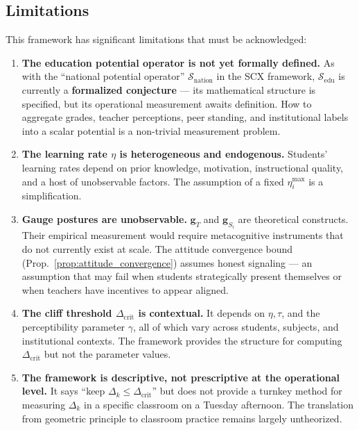 \documentclass[11pt,a4paper]{article}
\newcommand{\cS}{\mathcal{S}}
\begin{document}
\subsection{Limitations}
This framework has significant limitations that must be acknowledged:
\begin{enumerate}[label=(\arabic*)]
    \item \textbf{The education potential operator is not yet formally defined.} As with the ``national potential operator'' $\cS_{\text{nation}}$ in the SCX framework, $\cS_{\text{edu}}$ is currently a \textbf{formalized conjecture} — its mathematical structure is specified, but its operational measurement awaits definition. How to aggregate grades, teacher perceptions, peer standing, and institutional labels into a scalar potential is a non-trivial measurement problem.
    \item \textbf{The learning rate $\eta$ is heterogeneous and endogenous.} Students' learning rates depend on prior knowledge, motivation, instructional quality, and a host of unobservable factors. The assumption of a fixed $\eta_i^{\max}$ is a simplification.
    \item \textbf{Gauge postures are unobservable.} $\mathbf{g}_T$ and $\mathbf{g}_{S_i}$ are theoretical constructs. Their empirical measurement would require metacognitive instruments that do not currently exist at scale. The attitude convergence bound (Prop.~\ref{prop:attitude_convergence}) assumes honest signaling — an assumption that may fail when students strategically present themselves or when teachers have incentives to appear aligned.
    \item \textbf{The cliff threshold $\Delta_{\text{crit}}$ is contextual.} It depends on $\eta, \tau$, and the perceptibility parameter $\gamma$, all of which vary across students, subjects, and institutional contexts. The framework provides the structure for computing $\Delta_{\text{crit}}$ but not the parameter values.
    \item \textbf{The framework is descriptive, not prescriptive at the operational level.} It says ``keep $\Delta_k \leq \Delta_{\text{crit}}$'' but does not provide a turnkey method for measuring $\Delta_k$ in a specific classroom on a Tuesday afternoon. The translation from geometric principle to classroom practice remains largely untheorized.
\end{enumerate}
\end{document}
